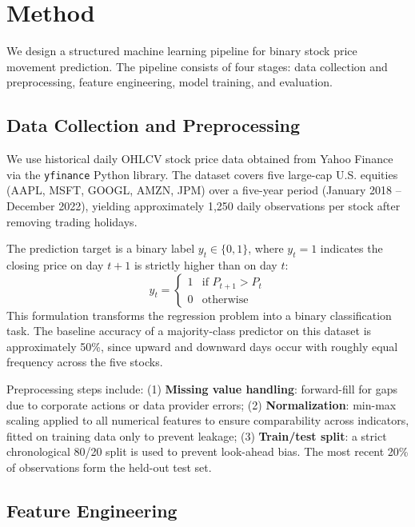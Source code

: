 \documentclass{article}
\begin{document}
\section{Method}

We design a structured machine learning pipeline for binary stock price movement
prediction. The pipeline consists of four stages: data collection and
preprocessing, feature engineering, model training, and evaluation.

\subsection{Data Collection and Preprocessing}

We use historical daily OHLCV stock price data obtained from Yahoo Finance via
the \texttt{yfinance} Python library. The dataset covers five large-cap U.S.
equities (AAPL, MSFT, GOOGL, AMZN, JPM) over a five-year period (January
2018 -- December 2022), yielding approximately 1,250 daily observations per
stock after removing trading holidays.

The prediction target is a binary label $y_t \in \{0, 1\}$, where $y_t = 1$
indicates the closing price on day $t+1$ is strictly higher than on day $t$:
\[
y_t =
\begin{cases}
1 & \text{if } P_{t+1} > P_t \\
0 & \text{otherwise}
\end{cases}
\]
This formulation transforms the regression problem into a binary classification
task. The baseline accuracy of a majority-class predictor on this dataset is
approximately 50\%, since upward and downward days occur with roughly equal
frequency across the five stocks.

Preprocessing steps include: (1) \textbf{Missing value handling}: forward-fill
for gaps due to corporate actions or data provider errors; (2)
\textbf{Normalization}: min-max scaling applied to all numerical features to
ensure comparability across indicators, fitted on training data only to prevent
leakage; (3) \textbf{Train/test split}: a strict chronological 80/20 split is
used to prevent look-ahead bias. The most recent 20\% of observations form the
held-out test set.

\subsection{Feature Engineering}
\end{document}
